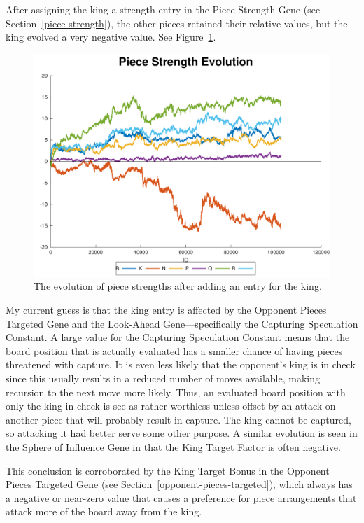\documentclass[letterpaper]{article}
\renewcommand{\_}{\allowbreak\textunderscore\allowbreak}
\begin{document}
After assigning the king a strength entry in the Piece Strength Gene (see Section~\ref{piece-strength}), the other pieces retained their relative values, but the king evolved a very negative value. See Figure~\ref{piece-strength-with-king-plot}.
\begin{figure}[htb]
	\centering
	\includegraphics[width=\textwidth]{piece-strength-with-king-plot}
	\caption{The evolution of piece strengths after adding an entry for the king.}\label{piece-strength-with-king-plot}
\end{figure}

My current guess is that the king entry is affected by the Opponent Pieces Targeted  Gene and the Look-Ahead Gene---specifically the Capturing Speculation Constant. A large value for the Capturing Speculation Constant means that the board position that is actually evaluated has a smaller chance of having pieces threatened with capture. It is even less likely that the opponent's king is in check since this usually results in a reduced number of moves available, making recursion to the next move more likely. Thus, an evaluated board position with only the king in check is see as rather worthless unless offset by an attack on another piece that will probably result in capture. The king cannot be captured, so attacking it had better serve some other purpose. A similar evolution is seen in the Sphere of Influence Gene in that the King Target Factor is often negative.

This conclusion is corroborated by the King Target Bonus in the Opponent Pieces Targeted Gene (see Section~\ref{opponent-pieces-targeted}), which always has a negative or near-zero value that causes a preference for piece arrangements that attack more of the board away from the king.
\end{document}
